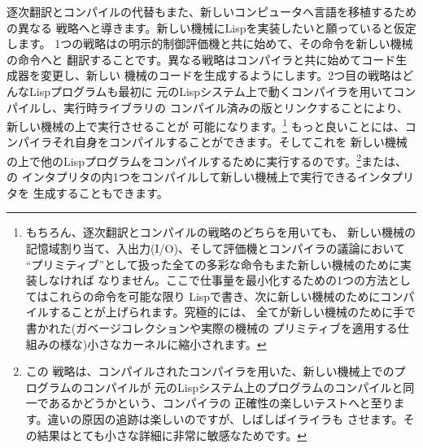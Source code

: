 逐次翻訳とコンパイルの代替もまた、新しいコンピュータへ言語を移植するための異なる
戦略へと導きます。新しい機械にLispを実装したいと願っていると仮定します。
1つの戦略はの明示的制御評価機と共に始めて、その命令を新しい機械の命令へと
翻訳することです。異なる戦略はコンパイラと共に始めてコード生成器を変更し、新しい
機械のコードを生成するようにします。2つ目の戦略はどんなLispプログラムも最初に
元のLispシステム上で動くコンパイラを用いてコンパイルし、実行時ライブラリの
コンパイル済みの版とリンクすることにより、新しい機械の上で実行させることが
可能になります。\footnote{もちろん、逐次翻訳とコンパイルの戦略のどちらを用いても、
新しい機械の記憶域割り当て、入出力(I/O)、そして評価機とコンパイラの議論において
``プリミティブ''として扱った全ての多彩な命令もまた新しい機械のために実装しなければ
なりません。ここで仕事量を最小化するための1つの方法としてはこれらの命令を可能な限り
Lispで書き、次に新しい機械のためにコンパイルすることが上げられます。究極的には、
全てが新しい機械のために手で書かれた(ガベージコレクションや実際の機械の
プリミティブを適用する仕組みの様な)小さなカーネルに縮小されます。}
もっと良いことには、コンパイラそれ自身をコンパイルすることができます。そしてこれを
新しい機械の上で他のLispプログラムをコンパイルするために実行するのです。\footnote{この
戦略は、コンパイルされたコンパイラを用いた、新しい機械上でのプログラムのコンパイルが
元のLispシステム上のプログラムのコンパイルと同一であるかどうかという、コンパイラの
正確性の楽しいテストへと至ります。違いの原因の追跡は楽しいのですが、しばしばイライラも
させます。その結果はとても小さな詳細に非常に敏感なためです。}または、の
インタプリタの内1つをコンパイルして新しい機械上で実行できるインタプリタを
生成することもできます。

